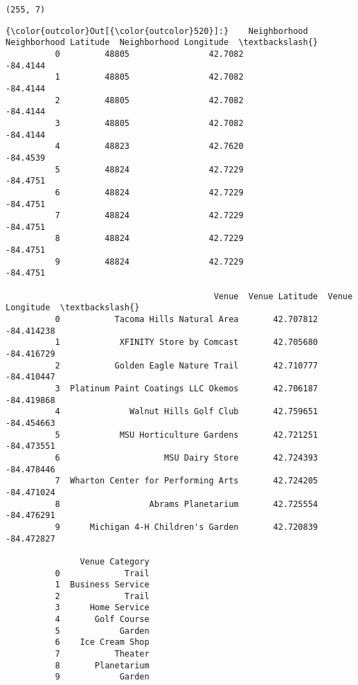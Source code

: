 \documentclass[11pt]{article}
\begin{document}
    \begin{Verbatim}[commandchars=\\\{\}]
(255, 7)

    \end{Verbatim}

\begin{Verbatim}[commandchars=\\\{\}]
{\color{outcolor}Out[{\color{outcolor}520}]:}    Neighborhood  Neighborhood Latitude  Neighborhood Longitude  \textbackslash{}
          0         48805                42.7082                -84.4144   
          1         48805                42.7082                -84.4144   
          2         48805                42.7082                -84.4144   
          3         48805                42.7082                -84.4144   
          4         48823                42.7620                -84.4539   
          5         48824                42.7229                -84.4751   
          6         48824                42.7229                -84.4751   
          7         48824                42.7229                -84.4751   
          8         48824                42.7229                -84.4751   
          9         48824                42.7229                -84.4751   
          
                                          Venue  Venue Latitude  Venue Longitude  \textbackslash{}
          0           Tacoma Hills Natural Area       42.707812       -84.414238   
          1            XFINITY Store by Comcast       42.705680       -84.416729   
          2           Golden Eagle Nature Trail       42.710777       -84.410447   
          3  Platinum Paint Coatings LLC Okemos       42.706187       -84.419868   
          4              Walnut Hills Golf Club       42.759651       -84.454663   
          5            MSU Horticulture Gardens       42.721251       -84.473551   
          6                     MSU Dairy Store       42.724393       -84.478446   
          7  Wharton Center for Performing Arts       42.724205       -84.471024   
          8                  Abrams Planetarium       42.725554       -84.476291   
          9      Michigan 4-H Children's Garden       42.720839       -84.472827   
          
               Venue Category  
          0             Trail  
          1  Business Service  
          2             Trail  
          3      Home Service  
          4       Golf Course  
          5            Garden  
          6    Ice Cream Shop  
          7           Theater  
          8       Planetarium  
          9            Garden  
\end{Verbatim}
            
\end{document}
